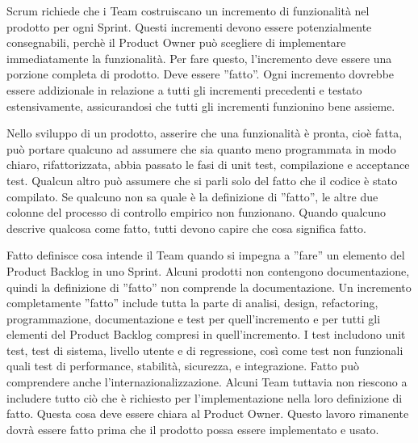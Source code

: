 
Scrum richiede che i Team costruiscano un incremento di funzionalit\`a nel prodotto per ogni Sprint. Questi incrementi devono essere potenzialmente consegnabili, perch\`e  il Product Owner pu\`o scegliere di implementare immediatamente la funzionalit\`a. Per fare questo, l'incremento deve essere una porzione completa di prodotto. Deve essere  ''fatto''. Ogni incremento dovrebbe essere addizionale in relazione a tutti gli incrementi precedenti e testato estensivamente, assicurandosi che tutti gli incrementi funzionino bene assieme.
\newline

Nello sviluppo di un prodotto, asserire che una funzionalit\`a è pronta, cio\`e fatta, pu\`o portare qualcuno ad assumere che sia quanto meno programmata in modo chiaro, rifattorizzata, abbia passato le fasi di unit test, compilazione e acceptance test. Qualcun altro pu\`o assumere che si parli solo del fatto che il codice \`e stato compilato. Se qualcuno non sa quale \`e la definizione di ''fatto'', le altre due colonne del processo di controllo empirico non funzionano. Quando qualcuno descrive qualcosa come fatto, tutti devono capire che cosa significa fatto.
\newline

Fatto definisce cosa intende il Team quando si impegna a ''fare'' un elemento del Product Backlog in uno Sprint. Alcuni prodotti non contengono documentazione, quindi la definizione di ''fatto'' non comprende la documentazione. Un incremento completamente ''fatto'' include tutta la parte di analisi, design, refactoring, programmazione, documentazione e test per quell'incremento e per tutti gli elementi del Product Backlog compresi in quell'incremento. I test includono unit test, test di sistema, livello utente e di regressione, cos\`i come test non funzionali quali test di performance, stabilit\`a, sicurezza, e integrazione. Fatto pu\`o comprendere anche l'internazionalizzazione. Alcuni Team tuttavia non riescono a includere tutto ci\`o che \`e richiesto per l'implementazione nella loro definizione di fatto. Questa cosa deve essere chiara al Product Owner. Questo lavoro rimanente dovr\`a essere fatto prima che il prodotto possa essere implementato e usato.
